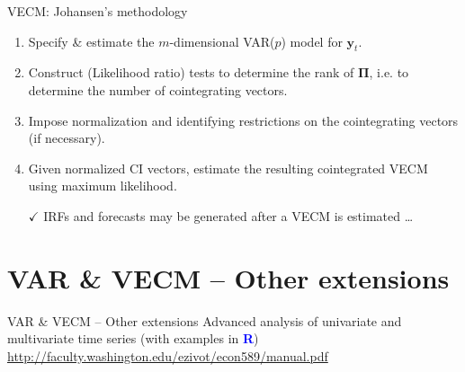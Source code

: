 \documentclass[usenames,dvipsnames]{beamer}
\begin{document}
\begin{frame}{VECM: Johansen’s methodology}
\begin{enumerate}[1.]
\item Specify \& estimate the $m$-dimensional VAR($p$) model for $\bm{y}_t$.
\vspace{0.2cm}
\item Construct (Likelihood ratio) tests to determine the rank of $\bm{\Pi}$, i.e. to determine the number of cointegrating vectors.
\vspace{0.2cm}
\item Impose normalization and identifying restrictions on the cointegrating vectors (if necessary).
\vspace{0.2cm}
\item Given normalized CI vectors, estimate the resulting cointegrated VECM using maximum likelihood.
\end{enumerate}
\begin{itemize}
\item[$\checkmark$] IRFs and forecasts may be generated after a VECM is estimated \dots
\end{itemize}
\end{frame}
\section{VAR \& VECM – Other extensions}
\begin{frame}{VAR \& VECM – Other extensions}
Advanced analysis of univariate and multivariate time series (with examples in 
\textcolor{Blue}{\textbf{R}})\\
\bigskip
\textcolor{Blue}{
\tiny
\url{http://faculty.washington.edu/ezivot/econ589/manual.pdf}
}
\end{frame}
\end{document}
